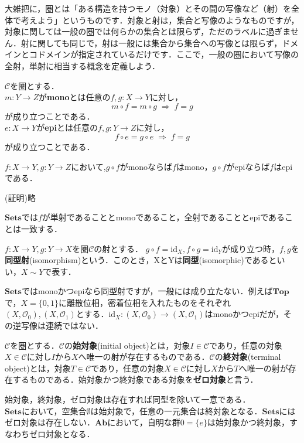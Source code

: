 大雑把に，圏とは「ある構造を持つモノ（対象）とその間の写像など（射）を全体で考えよう」というものです．対象と射は，集合と写像のようなものですが，対象に関しては一般の圏では何らかの集合とは限らず，ただのラベルに過ぎません．射に関しても同じで，射は一般には集合から集合への写像とは限らず，ドメインとコドメインが指定されているだけです．ここで，一般の圏において写像の全射，単射に相当する概念を定義しよう．
\begin{defi}
$\mathcal{C}$を圏とする．\\
$m:Y \to Z$が{\bf mono}とは任意の$f,g:X \to Y$に対し，
\[ m \circ f = m \circ g  \; \Rightarrow \; f = g \]
が成り立つことである．\\
$e:X \to Y$が{\bf epi}とは任意の$f,g:Y \to Z$に対し，
\[ f \circ e = g \circ e \; \Rightarrow \; f = g \]
が成り立つことである．
\end{defi} \proofend

\begin{prop}
$f:X \to Y , g:Y \to Z$において,$g \circ f$がmonoならば$f$はmono，$g \circ f$がepiならば$f$はepiである．
\end{prop}
(証明)\;略\proofend

$\mathbf{Sets}$では$f$が単射であることとmonoであること，全射であることとepiであることは一致する．

\begin{defi}
$f: X \to Y , g: Y \to X$を圏$\mathcal{C}$の射とする．%
$g \circ f = \mathrm{id}_X , f \circ g = \mathrm{id}_Y$が成り立つ時，$f,g$を{\bf 同型射}(isomorphism)という．このとき，XとYは{\bf 同型}(isomorphic)であるといい，$X \sim Y$で表す．
\end{defi} \proofend
$\mathbf{Sets}$ではmonoかつepiなら同型射ですが，一般には成り立たない．例えば$\mathbf{Top}$で，$X=\{0,1\}$に離散位相，密着位相を入れたものをそれぞれ$(X,\mathscr{O}_0),(X,\mathscr{O}_1)$とする．$\mathrm{id}_X : (X,\mathscr{O}_0) \to (X,\mathscr{O}_1)$はmonoかつepiだが，その逆写像は連続ではない．

\begin{defi}
$\mathcal{C}$を圏とする．$\mathcal{C}$の{\bf 始対象}(initial object)とは，対象$I \in \mathcal{C}$であり，任意の対象$X \in \mathcal{C}$に対し$I$から$X$へ唯一の射が存在するものである．$\mathcal{C}$の{\bf 終対象}(terminal object)とは，対象$T \in \mathcal{C}$であり，任意の対象$X \in \mathcal{C}$に対し$X$から$T$へ唯一の射が存在するものである．始対象かつ終対象である対象を{\bf ゼロ対象}と言う．
\end{defi} \proofend
始対象，終対象，ゼロ対象は存在すれば同型を除いて一意である．\\
$\mathbf{Sets}$において，空集合$\emptyset$は始対象で，任意の一元集合は終対象となる．$\mathbf{Sets}$にはゼロ対象は存在しない．$\mathbf{Ab}$において，自明な群$0 = \{e\}$は始対象かつ終対象，すなわちゼロ対象となる．

